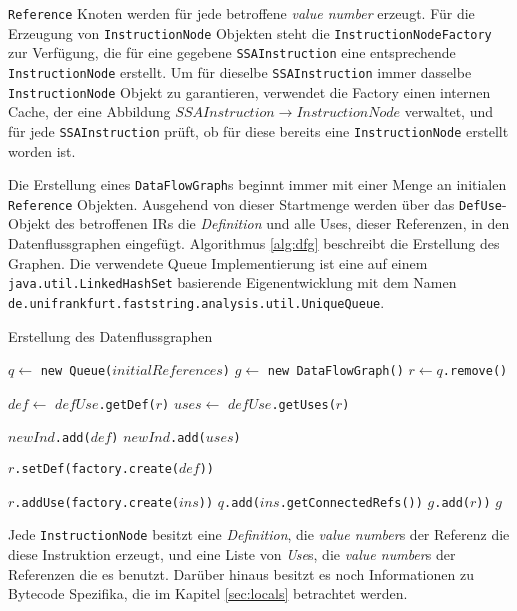 \texttt{Reference} Knoten werden für jede betroffene \textit{value number} erzeugt. Für
die Erzeugung von \texttt{InstructionNode} Objekten steht die 
\texttt{InstructionNodeFactory} zur Verfügung, die für eine gegebene 
\texttt{SSAInstruction} eine entsprechende \\\texttt{InstructionNode} erstellt. Um
für dieselbe \texttt{SSAInstruction} immer dasselbe \texttt{InstructionNode} 
Objekt zu garantieren, verwendet die Factory einen internen Cache, der eine 
Abbildung $SSAInstruction \rightarrow InstructionNode$ verwaltet, und für jede 
\texttt{SSAInstruction} prüft, ob für diese bereits eine \texttt{InstructionNode} 
erstellt worden ist.

Die Erstellung eines \texttt{DataFlowGraph}s beginnt immer mit einer Menge an 
initialen \texttt{Reference} Objekten. Ausgehend von dieser Startmenge werden über 
das \texttt{DefUse}-Objekt des betroffenen IRs die \textit{Definition} und alle Uses, 
dieser Referenzen, in den Datenflussgraphen eingefügt. Algorithmus \ref{alg:dfg} 
beschreibt die Erstellung des Graphen. Die verwendete Queue Implementierung ist eine 
auf einem \texttt{java.util.LinkedHashSet} basierende Eigenentwicklung mit dem Namen
\texttt{de.unifrankfurt.faststring.analysis.util.UniqueQueue}.

\begin{algorithm}[H]
	\caption{Erstellung des Datenflussgraphen}\label{alg:dfg}
	\begin{algorithmic}[1]
		\STATE $q \gets$ \texttt{new Queue($initialReferences$)}
		\STATE $g \gets$ \texttt{new DataFlowGraph()}
			\STATE $r \gets q$\texttt{.remove()}

				\STATE $def \gets$ \texttt{$defUse$.getDef($r$)}
				\STATE $uses \gets$ \texttt{$defUse$.getUses($r$)}

				\STATE \texttt{$newInd$.add($def$)}
				\STATE \texttt{$newInd$.add($uses$)}

				\STATE \texttt{$r$.setDef(factory.create($def$))}

					\STATE \texttt{$r$.addUse(factory.create($ins$))}
				\ENDFOR
					\STATE \texttt{$q$.add($ins$.getConnectedRefs())}
				\ENDFOR
				\STATE \texttt{$g$.add($r$))}
			\ENDIF
		\ENDWHILE
		\RETURN $g$
	\end{algorithmic}
\end{algorithm}

Jede \texttt{InstructionNode} besitzt eine \textit{Definition}, die \textit{value number}s der Referenz 
die diese Instruktion erzeugt, und eine Liste von \textit{Use}s, die \textit{value number}s der Referenzen 
die es benutzt. Darüber hinaus besitzt es noch Informationen zu Bytecode Spezifika, die 
im Kapitel \ref{sec:locals} betrachtet werden.

